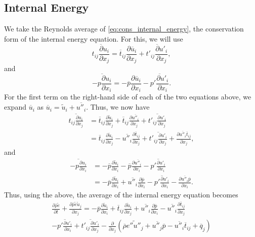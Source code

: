 \documentclass[oneside,a4paper,11pt]{report}
\newcommand{\rhoavg}{\overline{\rho}}
\newcommand{\pavg}{\overline{p}}
\newcommand{\qavg}{\overline{q}}
\newcommand{\tavg}{\overline{t}}
\newcommand{\uavg}{\overline{u}}
\newcommand{\pfluc}{p'}
\newcommand{\tfluc}{t'}
\newcommand{\ufluc}{u'}
\newcommand{\eavgf}{\widetilde{e}}
\newcommand{\uavgf}{\widetilde{u}}
\newcommand{\eflucf}{e''}
\newcommand{\uflucf}{u''}
\begin{document}
\subsection{Internal Energy}
We take the Reynolds average of \cref{eq:cons_internal_energy}, the conservation form of the internal energy equation. For this, we will use
\begin{equation}
    \overline{ t_{ij} \frac{\partial u_i}{\partial x_j} } = \tavg_{ij} \frac{\partial \uavg_i}{\partial x_j} + \overline{ \tfluc_{ij} \frac{\partial \ufluc_i}{\partial x_j} },
\end{equation}
and
\begin{equation}
    \overline{ -p \frac{\partial u_i}{\partial x_i} } = -\pavg \frac{\partial \uavg_i}{\partial x_i} - \overline{ \pfluc \frac{\partial \ufluc_i}{\partial x_i} }.
\end{equation}
For the first term on the right-hand side of each of the two equations above, we expand $\uavg_i$ as $\uavg_i = \uavgf_i + \overline{ \uflucf_i }$. Thus, we now have 
\begin{align}
    \overline{ t_{ij} \frac{\partial u_i}{\partial x_j} } &=  \tavg_{ij}  \frac{\partial \uavgf_i}{\partial x_j} + \tavg_{ij}  \frac{\partial \overline{ \uflucf_i } }{\partial x_j} + \overline{ \tfluc_{ij} \frac{\partial \ufluc_i}{\partial x_j} } \nonumber \\
    &= \tavg_{ij} \frac{\partial \uavgf_i}{\partial x_j} - \overline{ \uflucf_i } \frac{\partial \tavg_{ij} }{\partial x_j} + \overline{ \tfluc_{ij} \frac{\partial \ufluc_i}{\partial x_j} } + \frac{\partial \overline{ \uflucf_i } \tavg_{ij} }{\partial x_j},
\end{align}
and
\begin{align}
    \overline{ -p \frac{\partial u_i}{\partial x_i} } &= -\pavg \frac{\partial \uavgf_i}{\partial x_i} - \pavg \frac{\partial \overline{ \uflucf_i } }{\partial x_i} - \overline{ \pfluc \frac{\partial \ufluc_i}{\partial x_i} } \nonumber \\
    &= -\pavg \frac{\partial \uavgf_i}{\partial x_i} + \overline{ \uflucf_i } \frac{\partial \pavg}{\partial x_i} - \overline{ \pfluc \frac{\partial \ufluc_i}{\partial x_i} } - \frac{\partial \overline{ \uflucf_i } \pavg}{\partial x_i}.
\end{align}
Thus, using the above, the average of the internal energy equation becomes
\begin{multline}
    \frac{\partial \rhoavg \eavgf}{\partial t} + \frac{\partial \rhoavg \eavgf \uavgf_j}{\partial x_j} = -\pavg \frac{\partial \uavgf_i}{\partial x_i} + \tavg_{ij} \frac{\partial \uavgf_i}{\partial x_j} + \overline{ \uflucf_i } \frac{\partial \pavg}{\partial x_i} - \overline{ \uflucf_i } \frac{\partial \tavg_{ij} }{\partial x_j} \\
    - \overline{ \pfluc \frac{\partial \ufluc_i}{\partial x_i} } + \overline{ \tfluc_{ij} \frac{\partial \ufluc_i}{\partial x_j} } - \frac{\partial}{\partial x_j} \left ( \rhoavg \widetilde{ \eflucf \uflucf_j }  +  \overline{ \uflucf_j } \pavg - \overline{ \uflucf_i } \tavg_{ij} + \qavg_j \right )
\end{multline}
\end{document}
